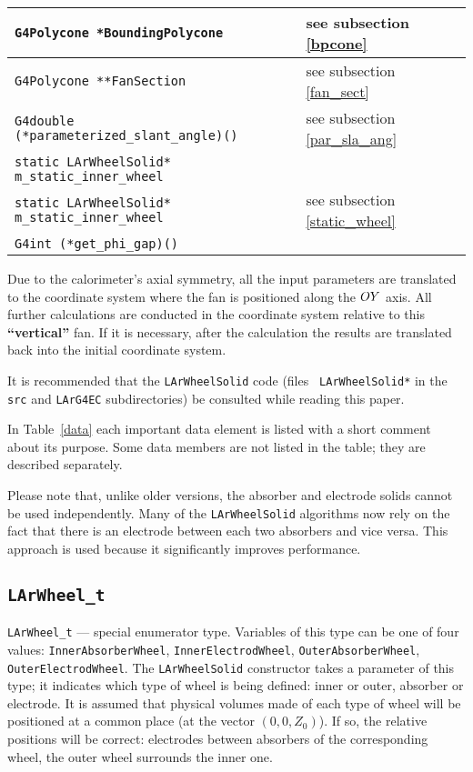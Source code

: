 \documentclass{article}
\begin{document}
\begin{table}
\begin{tabular}{|p{}|p{}|}
\hline 
{\tt G4Polycone *BoundingPolycone} & see subsection \ref{bpcone}\\ \hline
{\tt G4Polycone **FanSection} & see subsection \ref{fan_sect}\\ \hline
\shortstack[l]{\tt G4double\\ (*parameterized\_slant\_angle)()} & see subsection
\ref{par_sla_ang} \\ \hline
{\tt static LArWheelSolid* m\_static\_inner\_wheel} &  \\
{\tt static LArWheelSolid* m\_static\_inner\_wheel} & see subsection
\ref{static_wheel}\\ 
{\tt G4int (*get\_phi\_gap)()} & \\ \hline
\end{tabular}
\end{table}

Due to the calorimeter's axial symmetry, all the input parameters are
translated to the coordinate system where the fan is positioned along
the $OY\/$ axis. All further calculations are conducted in the
coordinate system relative to this {\bf ``vertical''} fan. If it is
necessary, after the calculation the results are translated back into
the initial coordinate system.

It is recommended that the {\tt LArWheelSolid} code (files {\tt
LArWheelSolid*} in the {\tt src} and {\tt LArG4EC} subdirectories) be
consulted while reading this paper.

In Table~\ref{data} each important data element is listed 
with a short comment about
its purpose. 
Some data members are not listed in the table; they are described separately.

Please note that, unlike older versions, the absorber and electrode
solids cannot be used independently. Many of the {\tt LArWheelSolid} algorithms now 
rely on the fact that there
is an electrode between each two absorbers and vice versa. This approach is used
because it significantly improves performance.

\subsection{\tt LArWheel\_t}\label{type}
{\tt LArWheel\_t} --- special enumerator type.
Variables of this type can be one of four values: {\tt InnerAbsorberWheel},
{\tt InnerElectrodWheel}, {\tt OuterAbsorberWheel},\\ {\tt OuterElectrodWheel}.
The {\tt LArWheelSolid} constructor takes a parameter of this type; 
it indicates which type of wheel is being defined: 
inner or outer, absorber or electrode.
It is assumed that physical volumes made of each type of wheel will be positioned
at a common place (at the vector $(0, 0, Z_0)$). If so, the relative positions 
will be correct: electrodes between absorbers of the corresponding wheel,
the outer wheel surrounds the inner one.
\end{document}
